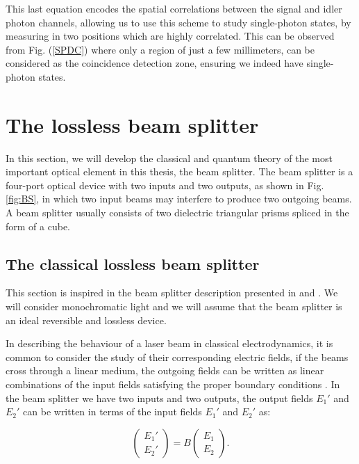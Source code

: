 \documentclass[12pt]{book}
\begin{document}
This last equation encodes the spatial correlations between the signal and idler photon channels, allowing us to use this scheme to study single-photon states, by measuring in two positions which are highly correlated. This can be observed from Fig. (\ref{SPDC}) where only a region of just a few millimeters, can be considered as  the coincidence detection zone, ensuring  we indeed have single-photon states.



\section{The lossless beam splitter}


In this section, we will develop the classical and quantum theory of the most important optical element in this thesis, the beam splitter. The beam splitter is a four-port optical device with two inputs and two outputs, as shown in Fig. \ref{fig:BS}, in which two input beams may interfere to produce two outgoing beams. A beam splitter usually consists of two dielectric triangular prisms spliced in the form of a cube.

\subsection{The  classical lossless beam splitter}

This section is inspired in the beam splitter description presented in \cite{leonhardt} and \cite{ludon}. We will consider monochromatic light and we will assume that the beam splitter is an ideal reversible and lossless device.


In describing the behaviour of a laser beam in classical electrodynamics, it is common to consider the study of their corresponding electric fields, if the beams cross through a linear medium, the outgoing fields can be written as linear combinations of the input fields satisfying the proper boundary conditions \cite{jackson}. In the beam splitter we have two inputs and two outputs, the output fields $E_{1}'$ and $E_{2}'$  can be written in terms of the input fields $E_{1}'$ and $E_{2}'$ as:

\begin{equation}
\begin{pmatrix} E_{1}' \\ E_{2}' \end{pmatrix}=B\begin{pmatrix} E_{1} \\ E_{2} \end{pmatrix}.\label{rule}
\end{equation}
\end{document}
